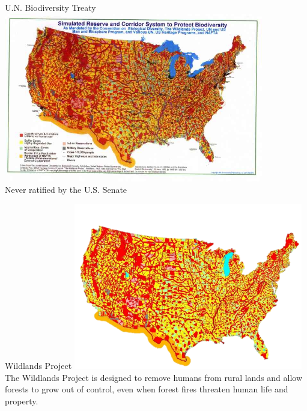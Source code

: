 \begin{frame}{U.N. Biodiversity Treaty}
    \centering
    \includegraphics[width=0.85\textwidth]{img/biodiversity.png} \\
    Never ratified by the U.S. Senate \\
\end{frame}

\begin{frame}{Wildlands Project}
    \centering
    \includegraphics[width=0.75\textwidth]{img/wildlands.png} \\
    The Wildlands Project is designed to remove humans from rural lands and allow forests to grow out of control, even when forest fires threaten human life and property. \\
\end{frame}


%

